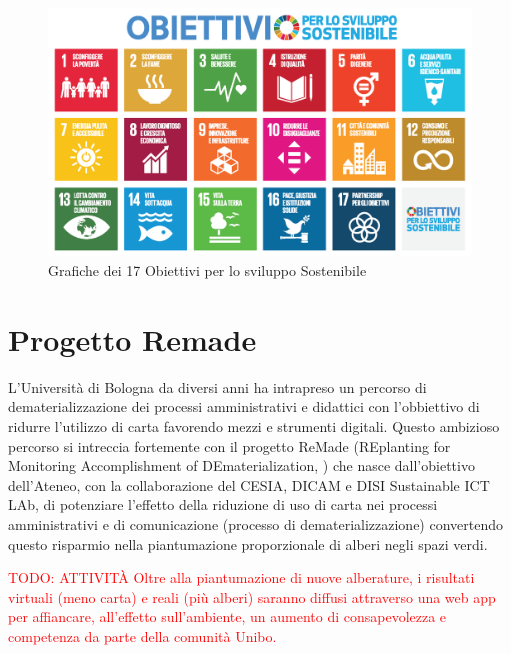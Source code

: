 \begin{figure}[h]
    \centering
    \includegraphics[width=\textwidth]{img/SDG_Poster.png}
    \caption{Grafiche dei 17 Obiettivi per lo sviluppo Sostenibile}
    \label{fig:sdgs}
\end{figure}
%
%
\section{Progetto Remade}
L'Università di Bologna da diversi anni ha intrapreso un percorso di dematerializzazione dei processi amministrativi e didattici con l'obbiettivo di ridurre l'utilizzo di carta favorendo mezzi e strumenti digitali.
%
Questo ambizioso percorso si intreccia fortemente con il progetto ReMade (REplanting for Monitoring Accomplishment of DEmaterialization, \cite{remade_project}) che nasce dall'obiettivo dell'Ateneo, con la collaborazione del CESIA, DICAM e DISI Sustainable ICT LAb, di potenziare l'effetto della riduzione di uso di carta nei processi amministrativi e di comunicazione (processo di dematerializzazione) convertendo questo risparmio nella piantumazione proporzionale di alberi negli spazi verdi.

\textcolor{red}{TODO: 
ATTIVITÀ
Oltre alla piantumazione di nuove alberature, i risultati virtuali (meno carta) e reali (più alberi) saranno diffusi attraverso una web app per affiancare, all'effetto sull'ambiente, un aumento di consapevolezza e competenza da parte della comunità Unibo.}

